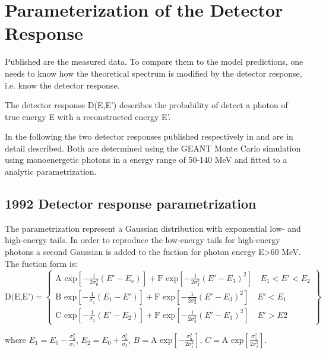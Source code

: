 \section { Parameterization of the Detector Response}


Published are the measured data. To compare them to the model predictions,
one needs to know how the theoretical spectrum is modified by the detector
response, i.e. know the detector response.

The detector response D(E,E') describes the probability of detect a photon
 of true energy E with a reconstructed energy E'.

In the following the two detector responses published respectively in 
 \cite{RMC_1992_PhysRevC.46.1094} and \cite{RMC_1998_PhysRevC.58.1767}
 are in detail described.
 Both are determined using the GEANT Monte Carlo simulation using monoenergetic photons
 in a energy range of 50-140 MeV and fitted to a analytic parametrization.

\subsection { 1992 Detector response parametrization}
The parametrization represent a Gaussian distribution with exponential low- and
 high-energy tails. In order to reproduce the low-energy tails for high-energy photons a second Gaussian is added to the fuction for photon energy E>60 MeV.
The fuction form is:
\begin{equation}
\text{D(E,E')}= \left\{
\begin{array}{ll}
                \text{A exp}\left[-\frac{1}{2\sigma_0^2}(E'-E_o)\right]+
                \text{F exp}\left[-\frac{1}{2\sigma_3^2}(E'-E_3)^2\right]
 \quad E_1<E'<E_2 \\
                \text{B exp}\left[-\frac{1}{\sigma_1}(E_1-E') \right]+
                \text{F exp}\left[-\frac{1}{2\sigma_3^2}(E'-E_3)^2\right]
 \quad E'<E_1      \\  
                \text{C exp}\left[-\frac{1}{\sigma_2}(E'-E_2)\right]+
                \text{F exp}\left[-\frac{1}{2\sigma_3^2}(E'-E_3)^2\right]
 \quad E'>E2     
 \end{array}
 \right\}
\end{equation}
 
where $E_1=E_0 - \frac{\sigma_0^2}{\sigma_1}$, $E_2 =E_0 + \frac{\sigma_0^2}{\sigma_2}$,
 $B=\text{A exp}\left[-\frac{\sigma_0^2}{2\sigma_1^2}\right]$, 
 $C=\text{A exp}\left[\frac{\sigma_0^2}{2\sigma_2^2}\right]$. 

